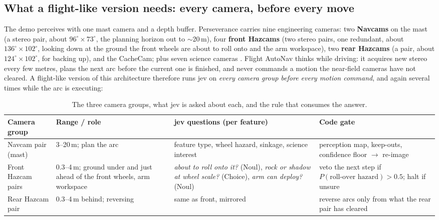 \documentclass[11pt]{article}
\newcommand{\rowrule}{\arrayrulecolor{black!22}\midrule\arrayrulecolor{black}}
\begin{document}
\subsection{What a flight-like version needs: every camera, before every move}
\label{sec:cameras}
The demo perceives with one mast camera and a depth buffer. Perseverance carries nine engineering cameras: two \textbf{Navcams} on the mast (a stereo pair, about $96^\circ \times 73^\circ$, the planning horizon out to $\sim$20\,m), four \textbf{front Hazcams} (two stereo pairs, one redundant, about $136^\circ \times 102^\circ$, looking down at the ground the front wheels are about to roll onto and the arm workspace), two \textbf{rear Hazcams} (a pair, about $124^\circ \times 102^\circ$, for backing up), and the CacheCam; plus seven science cameras \cite{maki}. Flight AutoNav thinks while driving: it acquires new stereo every few metres, plans the next arc before the current one is finished, and never commands a motion the near-field cameras have not cleared. A flight-like version of this architecture therefore runs jev on \emph{every camera group before every motion command}, and again several times while the arc is executing:

\begin{table}[h]
\centering\small
\begin{tabular}{@{}p{2.6cm}p{2.4cm}p{5.0cm}p{4.6cm}@{}}
\toprule
Camera group & Range / role & jev questions (per feature) & Code gate \\
\midrule
Navcam pair (mast) & 3--20\,m; plan the arc & feature type, wheel hazard, sinkage, science interest & perception map, keep-outs, confidence floor $\to$ re-image \\
\rowrule
Front Hazcam pairs & 0.3--4\,m; ground under and just ahead of the front wheels, arm workspace & \emph{about to roll onto it?} (Noul), \emph{rock or shadow at wheel scale?} (Choice), \emph{arm can deploy?} (Noul) & veto the next step if $P(\text{roll-over hazard})>0.5$; halt if unsure \\
\rowrule
Rear Hazcam pair & 0.3--4\,m behind; reversing & same as front, mirrored & reverse arcs only from what the rear pair has cleared \\
\bottomrule
\end{tabular}
\caption{The three camera groups, what jev is asked about each, and the rule that consumes the answer.}
\end{table}
\end{document}
